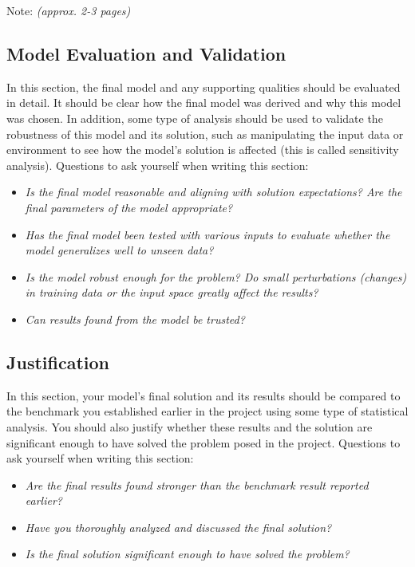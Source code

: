 \documentclass{article}
\begin{document}
Note: \emph{(approx. 2-3 pages)}

\subsection{Model Evaluation and
Validation}\label{model-evaluation-and-validation}

In this section, the final model and any supporting qualities should be
evaluated in detail. It should be clear how the final model was derived
and why this model was chosen. In addition, some type of analysis should
be used to validate the robustness of this model and its solution, such
as manipulating the input data or environment to see how the model's
solution is affected (this is called sensitivity analysis). Questions to
ask yourself when writing this section:

\begin{itemize}
\item
  \emph{Is the final model reasonable and aligning with solution
  expectations? Are the final parameters of the model appropriate?}
\item
  \emph{Has the final model been tested with various inputs to evaluate
  whether the model generalizes well to unseen data?}
\item
  \emph{Is the model robust enough for the problem? Do small
  perturbations (changes) in training data or the input space greatly
  affect the results?}
\item
  \emph{Can results found from the model be trusted?}
\end{itemize}

\subsection{Justification}\label{justification}

In this section, your model's final solution and its results should be
compared to the benchmark you established earlier in the project using
some type of statistical analysis. You should also justify whether these
results and the solution are significant enough to have solved the
problem posed in the project. Questions to ask yourself when writing
this section:

\begin{itemize}
\item
  \emph{Are the final results found stronger than the benchmark result
  reported earlier?}
\item
  \emph{Have you thoroughly analyzed and discussed the final solution?}
\item
  \emph{Is the final solution significant enough to have solved the
  problem?}
\end{itemize}
\end{document}
